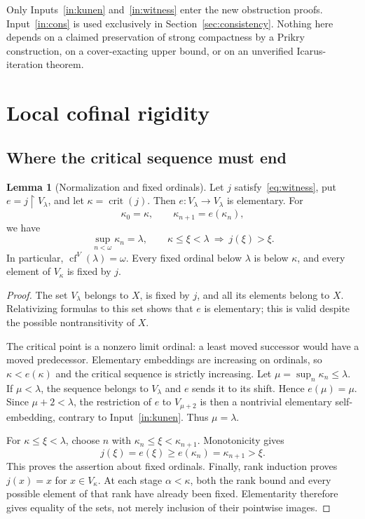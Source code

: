 \documentclass[11pt,letterpaper]{article}
\theoremstyle{definition}
\newtheorem{lemma}[definition]{Lemma}
\numberwithin{equation}{section}
\newcommand{\crit}{\operatorname{crit}}
\newcommand{\cf}{\operatorname{cf}}
\newcommand{\restr}{\mathbin{\upharpoonright}}
\begin{document}
Only Inputs~\ref{in:kunen} and~\ref{in:witness} enter the new obstruction proofs. Input~\ref{in:cons} is used exclusively in Section~\ref{sec:consistency}. Nothing here depends on a claimed preservation of strong compactness by a Prikry construction, on a cover-exacting upper bound, or on an unverified Icarus-iteration theorem.

\section{Local cofinal rigidity}\label{sec:local}

\subsection{Where the critical sequence must end}

\begin{lemma}[Normalization and fixed ordinals]\label{lem:normal}
Let $j$ satisfy~\eqref{eq:witness}, put $e=j\restr V_\lambda$, and let $\kappa=\crit(j)$. Then $e:V_\lambda\to V_\lambda$ is elementary. For
\[
\kappa_0=\kappa,\qquad \kappa_{n+1}=e(\kappa_n),
\]
we have
\begin{equation}
\sup_{n<\omega}\kappa_n=\lambda,
\qquad
\kappa\le\xi<\lambda\ \Longrightarrow\ j(\xi)>\xi.
\label{eq:normal}
\end{equation}
In particular, $\cf^V(\lambda)=\omega$. Every fixed ordinal below $\lambda$ is below $\kappa$, and every element of $V_\kappa$ is fixed by $j$.
\end{lemma}
\begin{proof}
The set $V_\lambda$ belongs to $X$, is fixed by $j$, and all its elements belong to $X$. Relativizing formulas to this set shows that $e$ is elementary; this is valid despite the possible nontransitivity of $X$.

The critical point is a nonzero limit ordinal: a least moved successor would have a moved predecessor. Elementary embeddings are increasing on ordinals, so $\kappa<e(\kappa)$ and the critical sequence is strictly increasing. Let $\mu=\sup_n\kappa_n\le\lambda$. If $\mu<\lambda$, the sequence belongs to $V_\lambda$ and $e$ sends it to its shift. Hence $e(\mu)=\mu$. Since $\mu+2<\lambda$, the restriction of $e$ to $V_{\mu+2}$ is then a nontrivial elementary self-embedding, contrary to Input~\ref{in:kunen}. Thus $\mu=\lambda$.

For $\kappa\le\xi<\lambda$, choose $n$ with $\kappa_n\le\xi<\kappa_{n+1}$. Monotonicity gives
\[
j(\xi)=e(\xi)\ge e(\kappa_n)=\kappa_{n+1}>\xi.
\]
This proves the assertion about fixed ordinals. Finally, rank induction proves $j(x)=x$ for $x\in V_\kappa$. At each stage $\alpha<\kappa$, both the rank bound and every possible element of that rank have already been fixed. Elementarity therefore gives equality of the sets, not merely inclusion of their pointwise images.
\end{proof}
\end{document}
